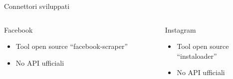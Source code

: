 \begin{frame}{Connettori sviluppati}
\begin{columns}
\begin{column}{0.5\textwidth}
\centering
\alert{Facebook}\\
\begin{itemize}
    \item Tool open source ``facebook-scraper''
    \item No API ufficiali
\end{itemize}
\end{column}

\begin{column}{0.5\textwidth}
\centering
\alert{Instagram}\\
\begin{itemize}
    \item Tool open source \\``instaloader''
    \item No API ufficiali
\end{itemize}

\end{column}

\end{columns}\leavevmode\newline
\begin{figure}
  \begin{center}
  
\end{center}
\end{figure}


\end{frame}

